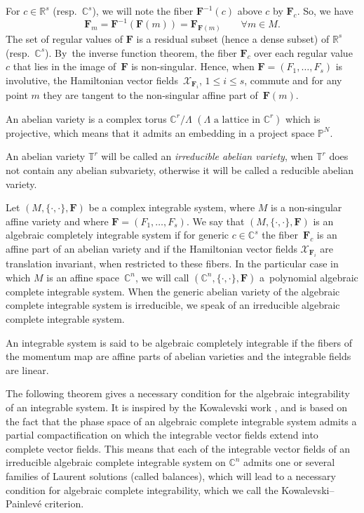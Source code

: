 \documentclass[pdftex]{sigma}
\numberwithin{equation}{section}
\begin{document}
For $c\in \mathbb{R}^s$ (resp.\ $\mathbb{C}^s$), we will note the
fiber $\mathbf{F}^{-1}(c)$ above $c$ by
$\mathbf{F}_c$. So, we have
\[\mathbf{F}_m=\mathbf{F}^{-1}(\mathbf{F}(m))=\mathbf{F}_{\mathbf{F} (m)}\qquad \forall m \in M.\]
The set of regular values of $\mathbf{F}$ is a residual
subset (hence a dense subset) of $\mathbb{R}^s$ (resp.\
$\mathbb{C}^s$). By~the inverse function theorem, the fiber
$\mathbf{F}_c$ over each regular value $c$ that lies in the
image of~$\mathbf{F}$ is non-singular. Hence, when
$\mathbf{F}=(F_1,\dots,F_s)$ is involutive, the
Hamiltonian vector fields~$\mathcal{X}_{\mathbf{F}_i }$,
$1\leq i \leq s$, commute and for any point $m$ they
are tangent to the non-singular affine part of~$\mathbf{F}(m)$.

\begin{Definition}
An abelian variety is a complex torus $\mathbb{C}^r/\Lambda$
$(\Lambda \mbox{ a lattice in } \mathbb{C}^r)$ which is
projective, which means that it admits an embedding in a project
space $\mathbb{P}^N$.
\end{Definition}

An abelian variety $\mathbb{T}^r$ will be called an
\textit{irreducible abelian variety}, when $\mathbb{T}^r$ does not
contain any abelian subvariety, otherwise it will be called a
reducible abelian variety.

\begin{Definition}
Let $(M,\{\cdot,\cdot\}, \mathbf{F})$ be a complex
integrable system, where $M$ is a non-singular affine variety and
where $\mathbf{F}=(F_1,\dots,F_s)$. We say that
$(M,\{\cdot,\cdot\}, \mathbf{F})$ is an algebraic completely integrable system if for generic $c
\in \mathbb{C}^s$ the fiber~$\mathbf{F}_c$ is an affine part of
an abelian variety and if the Hamiltonian vector fields
$\mathcal{X}_{\mathbf{F}_i } $ are translation invariant, when
restricted to these fibers. In the particular case in which $M$ is
an affine space~$\mathbb{C}^n$, we will call
$(\mathbb{C}^n,\{\cdot,\cdot\}, \mathbf{F})$ a~polynomial algebraic complete integrable system. When the generic abelian variety of the
algebraic complete integrable system is irreducible, we speak of an irreducible algebraic complete integrable
system.\looseness=1
\end{Definition}

 An integrable system is said to be algebraic completely integrable
if the fibers of the momentum map are affine parts of abelian varieties and the integrable fields are linear.

The following theorem gives a necessary condition for the algebraic
integrability of an integrable system. It is inspired by the
Kowalevski work \cite{Kowaleski}, and is based on the fact that the
phase space of an algebraic complete integrable system admits a partial compactification on
which the integrable vector fields extend into complete vector
fields. This means that each of the integrable vector fields of an
irreducible algebraic complete integrable system on $\mathbb{C}^n$ admits one or several
families of Laurent solutions (called balances), which will lead to
a necessary condition for algebraic complete integrability, which we
call the Kowalevski--Painlev\'e criterion.\looseness=1
\end{document}

